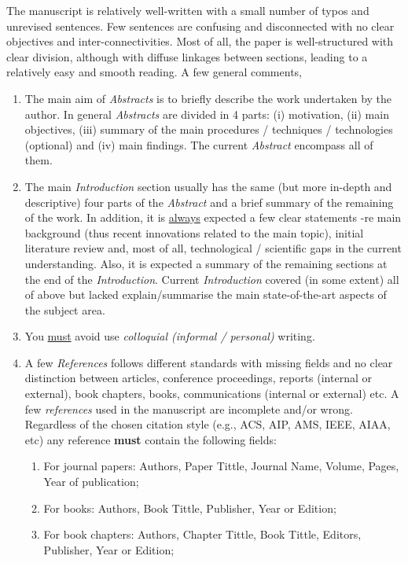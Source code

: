 \documentclass[14pt,twoside]{report}
\begin{document}
The manuscript is relatively well-written with a small number of typos and unrevised sentences. Few sentences are confusing and disconnected with no clear objectives and inter-connectivities. Most of all, the paper is well-structured with clear division, although with diffuse linkages between sections, leading to a relatively easy and smooth reading. A few general comments,

\begin{enumerate}
%
\item The main aim of {\it Abstracts} is to briefly describe the work undertaken by the author. In general {\it Abstracts} are divided in 4 parts: (i) motivation, (ii) main objectives, (iii) summary of the main procedures / techniques / technologies (optional) and (iv) main findings. The current {\it Abstract} encompass all of them. 
%
\item The main {\it Introduction} section usually has the same (but more in-depth and descriptive) four parts of the {\it Abstract} and a brief summary of the remaining of the work. In addition, it is \underline{always} expected a few clear statements -re main background (thus recent innovations related to the main topic), initial literature review and, most of all, technological / scientific gaps in the current understanding. Also, it is expected a summary of the remaining sections at the end of the {\it Introduction}.  Current {\it Introduction} covered (in some extent) all of above but lacked explain/summarise the main state-of-the-art aspects of the subject area. 
%
\item You \underline{must} avoid use {\it colloquial (informal / personal)} writing.  
%
\item A few {\it References} follows different standards with missing fields and no clear distinction between articles, conference proceedings, reports (internal or external), book chapters, books, communications (internal or external) etc.  A few {\it references} used in the manuscript are incomplete and/or wrong. Regardless of the chosen citation style (e.g., ACS, AIP, AMS, IEEE, AIAA, etc) any reference {\bf must} contain the following fields: 
\begin{enumerate}
\item For journal papers: Authors, Paper Tittle, Journal Name, Volume, Pages, Year of publication;
\item For books: Authors, Book Tittle, Publisher, Year or Edition;
\item For book chapters: Authors, Chapter Tittle, Book Tittle, Editors, Publisher, Year or Edition;

\end{enumerate}
\end{enumerate}
\end{document}

